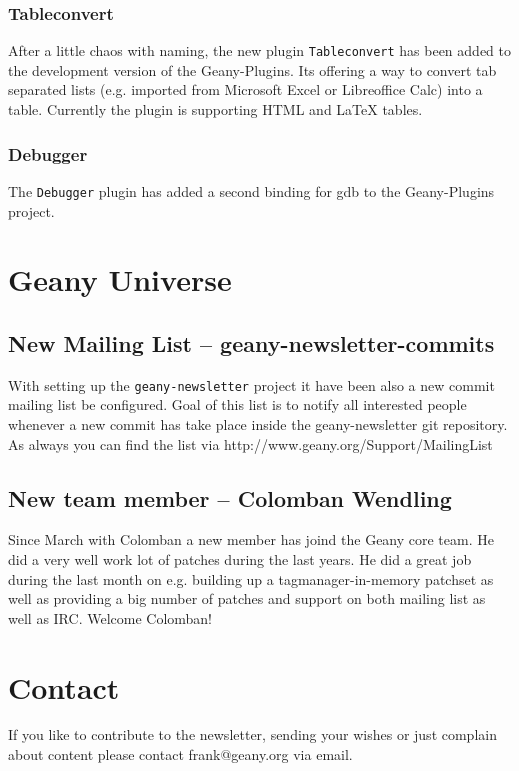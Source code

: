\documentclass[%
paper=a4,%
fontsize=11pt,%
twoside=false,%
DIV18,
headsepline,
plainheadsepline,
footsepline,
plainfootsepline,
parskip=half,%
openany,%
]{scrartcl}
\begin{document}
\subsubsection{Tableconvert}

After a little chaos with naming, the new plugin \texttt{Tableconvert}
has been added to the development version of the Geany-Plugins. Its
offering a way to convert tab separated lists (e.g. imported
from Microsoft Excel or Libreoffice Calc) into a table. Currently the
plugin is supporting HTML and \LaTeX{} tables.

\subsubsection{Debugger}

The \texttt{Debugger} plugin has added a second binding for gdb to
the Geany-Plugins project.

\section{Geany Universe}

\subsection{New Mailing List -- geany-newsletter-commits}

With setting up the \texttt{geany-newsletter} project it have been
also a new commit mailing list be configured. Goal of this list is
to notify all interested people whenever a new commit has take place
inside the geany-newsletter git repository. As always you can find
the list via http://www.geany.org/Support/MailingList

\subsection{New team member -- Colomban Wendling}

Since March with Colomban a new member has joind the Geany core
team. He did a very well work  lot of patches during the last years.
He did a great job during the last month on e.g. building up a
tagmanager-in-memory patchset as well as providing a big number of
patches and support on both mailing list as well as IRC. Welcome
Colomban!


\section{Contact}

If you like to contribute to the newsletter, sending your wishes or
just complain about content please contact frank@geany.org via email.
\end{document}
